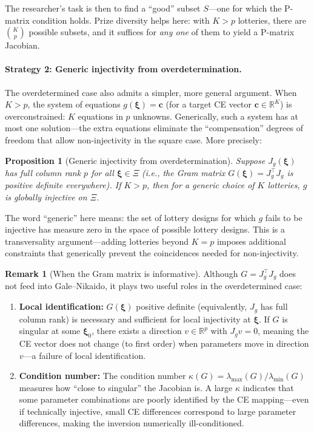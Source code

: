 \documentclass[11pt,a4paper]{article}
\newtheorem{proposition}[theorem]{Proposition}
\theoremstyle{definition}
\newtheorem{remark}[theorem]{Remark}
\newcommand{\R}{\mathbb{R}}
\newcommand{\bxi}{\boldsymbol{\xi}}
\begin{document}
The researcher's task is then to find a ``good'' subset $S$---one for which
the P-matrix condition holds. Prize diversity helps here: with $K > p$
lotteries, there are $\binom{K}{p}$ possible subsets, and it suffices for
\emph{any one} of them to yield a P-matrix Jacobian.

\paragraph{Strategy 2: Generic injectivity from overdetermination.}
The overdetermined case also admits a simpler, more general argument.
When $K > p$, the system of equations $g(\bxi) = \mathbf{c}$ (for a target CE
vector $\mathbf{c} \in \R^K$) is overconstrained: $K$ equations in $p$
unknowns. Generically, such a system has at most one solution---the extra
equations eliminate the ``compensation'' degrees of freedom that allow
non-injectivity in the square case. More precisely:

\begin{proposition}[Generic injectivity from overdetermination]
\label{prop:overdetermined_generic}
Suppose $J_g(\bxi)$ has full column rank $p$ for all $\bxi \in \Xi$ (i.e.,
the Gram matrix $G(\bxi) = J_g^\top J_g$ is positive definite everywhere).
If $K > p$, then for a generic choice of $K$ lotteries, $g$ is globally
injective on $\Xi$.
\end{proposition}

The word ``generic'' here means: the set of lottery designs for which $g$
fails to be injective has measure zero in the space of possible lottery
designs. This is a transversality argument---adding lotteries beyond $K = p$
imposes additional constraints that generically prevent the coincidences
needed for non-injectivity.

\begin{remark}[When the Gram matrix is informative]
\label{rem:gram_informative}
Although $G = J_g^\top J_g$ does not feed into Gale--Nikaido, it plays two
useful roles in the overdetermined case:
\begin{enumerate}
    \item \textbf{Local identification:} $G(\bxi)$ positive definite
    (equivalently, $J_g$ has full column rank) is necessary and sufficient
    for local injectivity at $\bxi$. If $G$ is singular at some $\bxi_0$,
    there exists a direction $v \in \R^p$ with $J_g v = 0$, meaning the CE
    vector does not change (to first order) when parameters move in direction
    $v$---a failure of local identification.

    \item \textbf{Condition number:} The condition number
    $\kappa(G) = \lambda_{\max}(G) / \lambda_{\min}(G)$ measures how
    ``close to singular'' the Jacobian is. A large $\kappa$ indicates that
    some parameter combinations are poorly identified by the CE
    mapping---even if technically injective, small CE differences correspond
    to large parameter differences, making the inversion numerically
    ill-conditioned.
\end{enumerate}
\end{remark}
\end{document}
